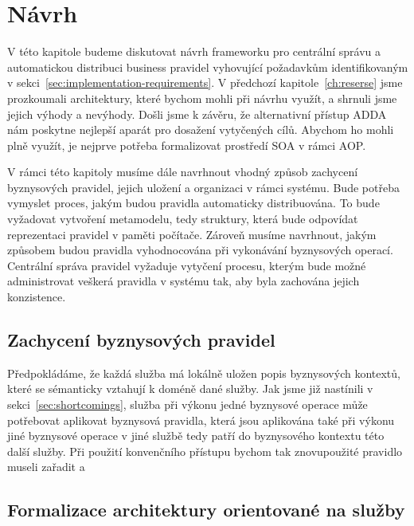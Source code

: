 

\chapter{Návrh}\label{ch:navrh}

V této kapitole budeme diskutovat návrh frameworku pro centrální správu
a automatickou distribuci business pravidel vyhovující požadavkům identifikovaným
v sekci~\ref{sec:implementation-requirements}. V předchozí kapitole~\ref{ch:reserse}
jsme prozkoumali architektury, které bychom mohli při návrhu využít, a shrnuli
jsme jejich výhody a nevýhody. Došli jsme k závěru, že alternativní přístup \gls{ADDA}
nám poskytne nejlepší aparát pro dosažení vytyčených cílů. Abychom ho mohli plně využít,
je nejprve potřeba formalizovat prostředí \gls{SOA} v rámci \gls{AOP}.

V rámci této kapitoly musíme dále navrhnout vhodný způsob zachycení byznysových pravidel,
jejich uložení a organizaci v rámci systému. Bude potřeba vymyslet proces, jakým budou pravidla
automaticky distribuována.
To bude vyžadovat vytvoření metamodelu, tedy struktury, která bude odpovídat reprezentaci pravidel
v paměti počítače.
Zároveň musíme navrhnout, jakým způsobem budou pravidla vyhodnocována při vykonávání byznysových operací.
Centrální správa pravidel vyžaduje vytyčení procesu, kterým bude možné administrovat
veškerá pravidla v systému tak, aby byla zachována jejich konzistence.

\section{Zachycení byznysových pravidel}

Předpokládáme, že každá služba má lokálně uložen popis byznysových kontextů, které se sémanticky vztahují
k doméně dané služby. Jak jsme již nastínili v sekci~\ref{sec:shortcomings}, služba při výkonu jedné byznysové
operace může potřebovat aplikovat byznysová pravidla, která jsou aplikována také při výkonu jiné byznysové operace
v jiné službě \textendash\xspace tedy patří do byznysového kontextu této další služby. Při použití konvenčního
přístupu bychom tak znovupoužité pravidlo museli zařadit a


\section{Formalizace architektury orientované na služby}

